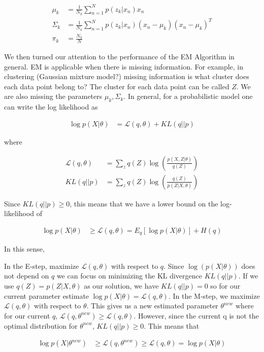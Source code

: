 \documentclass[11pt]{article}
\begin{document}
\begin{align*}
\mu_k &= \frac{1}{N_{k}}\sum_{n=1}^{N}{p(z_{k}|x_{n})x_{n}} \\
\Sigma_{k} &= \frac{1}{N_{k}}\sum_{n=1}^{N}{p(z_{k}|x_{n})(x_{n}-\mu_{k})(x_{n}-\mu_{k})^{T}} \\
\pi_{k} &= \frac{N_{k}}{N}
\end{align*}

We then turned our attention to the performance of the EM Algorithm in general.  
EM is applicable when there is missing information.  For example, in clustering (Gaussian mixture model?) missing information is what cluster does each data point belong to?  The cluster for each data point can be called ${Z}$.  We are also missing the parameters ${\mu_k}, {\Sigma_k}$.  In general, for a probabilistic model one can write the log likelihood as

\begin{align*}
\log p(X|\theta) &= \mathcal{L}(q,\theta) + KL(q||p)
\end{align*}

where

\begin{align*}
\mathcal{L}(q,\theta) &= \sum_{z}{q(Z)\log(\frac{p(X,Z|\theta)}{q(Z)})} \\
KL(q||p) &= \sum_{z}{q(Z)\log(\frac{q(Z)}{p(Z|X,\theta)})}
\end{align*}

Since $ KL(q||p) \geq 0$, this means that we have a lower bound on the log-likelihood of

\begin{align*}
\log p(X|\theta) &\geq \mathcal{L}(q,\theta) = E_{q}[\log p(X|\theta)] + H(q)
\end{align*}

In this sense, 

In the E-step, maximize $\mathcal{L}(q,\theta)$ with respect to $q$.  Since $\log(p(X|\theta))$ does not depend on $q$ we can focus on minimizing the KL divergence $KL(q||p)$. If we use $q(Z) = p(Z|X,\theta)$ as our solution, we have $KL(q||p) = 0$ so for our current parameter estimate $\log p(X|\theta) = \mathcal{L}(q,\theta)$. In the M-step, we maximize $\mathcal{L}(q,\theta)$ with respect to $\theta$. This gives us a new estimated parameter $\theta^{new}$ where for our current $q$, $\mathcal{L}(q,\theta^{new}) \geq \mathcal{L}(q,\theta)$.  However, since the current q is not the optimal distribution for $\theta^{new}$, $KL(q||p) \geq 0$. This means that 

\begin{align*}
\log p(X|\theta^{new}) &\geq \mathcal{L}(q,\theta^{new}) \geq \mathcal{L}(q,\theta) = \log p(X|\theta)
\end{align*}
\end{document}
